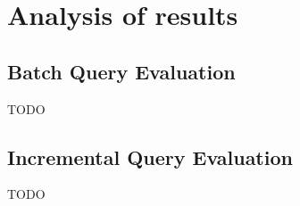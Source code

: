 \section{Analysis of results}


\subsection{Batch Query Evaluation}

TODO

% 

% 



\subsection{Incremental Query Evaluation}
TODO

